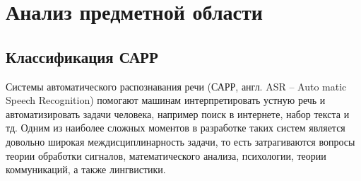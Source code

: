 \chapter{Анализ предметной области}

\section{Классификация САРР}
Системы автоматического распознавания речи (САРР, англ. ASR -- Auto matic Speech Recognition) помогают машинам интерпретировать устную речь и автоматизировать задачи человека, например поиск в интернете, набор текста и тд. Одним из наиболее сложных моментов в разработке таких систем является довольно широкая междисциплинарность задачи, то есть затрагиваются вопросы теории обработки сигналов, математического анализа, психологии, теории коммуникаций, а также лингвистики.

